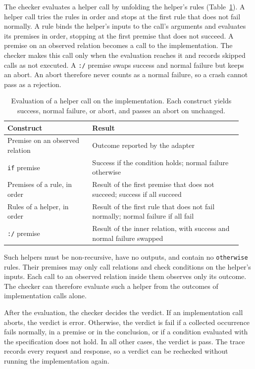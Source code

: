 The checker evaluates a helper call by unfolding the helper's rules
(Table~\ref{tab:helper-evaluation}).
A helper call tries the rules in order and stops at the first rule that does
not fail normally.
A rule binds the helper's inputs to the call's arguments and evaluates its
premises in order, stopping at the first premise that does not succeed.
A premise on an observed relation becomes a call to the implementation.
The checker makes this call only when the evaluation reaches it and records
skipped calls as not executed.
A \texttt{:/} premise swaps success and normal failure but keeps an abort.
An abort therefore never counts as a normal failure, so a crash cannot pass as
a rejection.

\begin{table}[t]
  \caption{Evaluation of a helper call on the implementation. Each construct
    yields success, normal failure, or abort, and passes an abort on unchanged.}
  \label{tab:helper-evaluation}
  \centering
  \small
  \begin{tabular}{@{}p{0.34\linewidth}p{0.6\linewidth}@{}}
    \toprule
    Construct & Result \tabularnewline
    \midrule
    Premise on an observed relation & \raggedright Outcome reported by the
      adapter \tabularnewline
    \texttt{if} premise & \raggedright Success if the condition holds; normal
      failure otherwise \tabularnewline
    Premises of a rule, in order & \raggedright Result of the first premise that
      does not succeed; success if all succeed \tabularnewline
    Rules of a helper, in order & \raggedright Result of the first rule that does
      not fail normally; normal failure if all fail \tabularnewline
    \texttt{:/} premise & \raggedright Result of the inner relation, with success
      and normal failure swapped \tabularnewline
    \bottomrule
  \end{tabular}
\end{table}

Such helpers must be non-recursive, have no outputs, and contain no
\texttt{otherwise} rules.
Their premises may only call relations and check conditions on the helper's
inputs.
Each call to an observed relation inside them observes only its outcome.
The checker can therefore evaluate such a helper from the outcomes of
implementation calls alone.

After the evaluation, the checker decides the verdict.
If an implementation call aborts, the verdict is error.
Otherwise, the verdict is fail if a collected occurrence fails normally, in a
premise or in the conclusion, or if a condition evaluated with the
specification does not hold.
In all other cases, the verdict is pass.
The trace records every request and response, so a verdict can be rechecked
without running the implementation again.

